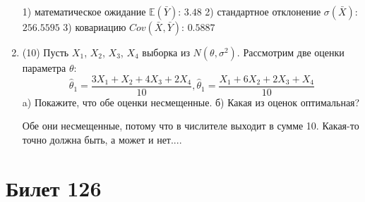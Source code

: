 \documentclass[a4paper,12pt]{article}
\begin{document}
\begin{enumerate}
1) математическое ожидание $\mathbb{E}(\bar Y)$: $3.48$ 
2) стандартное отклонение $\sigma(\bar X)$: $256.5595$
3) ковариацию $Cov(\bar X, \bar Y)$: $0.5887$


\item


(10) Пусть $X _{1}$, $X _{2}$, $X _{3}$, $X _{4}$ выборка из $N(\theta, \sigma ^{2})$. Рассмотрим две оценки параметра $\theta$:
\[\hat \theta _{1} = \frac{3X _{1} + X _{2} + 4X _{3} + 2X _{4}}{10}, \hat \theta _{1} = \frac{X _{1} + 6X _{2} + 2X _{3} + X _{4}}{10}\]
a) Покажите, что обе оценки несмещенные.
б) Какая из оценок оптимальная?




Обе они несмещенные, потому что в числителе выходит в сумме 10.
Какая-то точно должна быть, а может и нет....



\end{enumerate}

\section{Билет 126}
\end{document}
